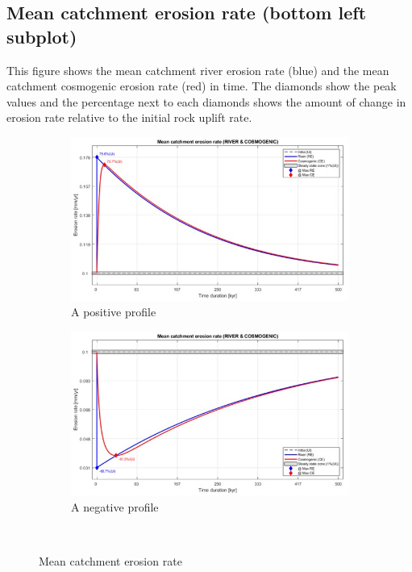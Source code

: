 \documentclass[11pt,a4paper,titlepage]{report}
\begin{document}
\subsection{Mean catchment erosion rate (bottom left subplot)}
This figure shows the mean catchment river erosion rate (blue) and the mean catchment cosmogenic erosion rate (red) in time. The diamonds show the peak values and the percentage next to each diamonds shows the amount of change in erosion rate relative to the initial rock uplift rate.\\

 
\begin{figure}[H]
    \centering
    \begin{subfigure}[H]{0.45\textwidth}
        \includegraphics[width=\textwidth]{+profileRC.jpg}
        \caption{A positive profile}
    \end{subfigure}
    \quad
    \begin{subfigure}[H]{0.45\textwidth}
        \includegraphics[width=\textwidth]{-profileRC.jpg}
        \caption{A negative profile}
    \end{subfigure}\\
    \caption[Mean catchment erosion rate]{Mean catchment erosion rate}
    \label{fig:erosionrate}    
\end{figure}
\end{document}
